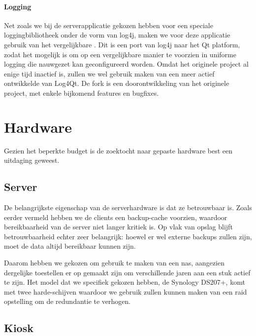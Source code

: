 \subsubsection{Logging}

Net zoals we bij de serverapplicatie gekozen hebben voor een speciale loggingbibliotheek onder de vorm van log4j, maken we voor deze applicatie gebruik van het vergelijkbare . Dit is een port van log4j naar het Qt platform, zodat het mogelijk is om op een vergelijkbare manier te voorzien in uniforme logging die nauwgezet kan geconfigureerd worden. Omdat het originele project al enige tijd inactief is, zullen we wel gebruik maken van een meer actief ontwikkelde  van Log4Qt. De fork is een doorontwikkeling van het originele project, met enkele bijkomend features en bugfixes.


%
%

\chapter{Hardware}
\label{ontwerp:hardware}

Gezien het beperkte budget is de zoektocht naar gepaste hardware best een uitdaging geweest.

\section{Server}
\label{ontwerp:hardware:server}

De belangrijkste eigenschap van de serverhardware is dat ze betrouwbaar is. Zoals eerder vermeld hebben we de clients een backup-cache voorzien, waardoor bereikbaarheid van de server niet langer kritiek is. Op vlak van opslag blijft betrouwbaarheid echter zeer belangrijk: hoewel er wel externe backups zullen zijn, moet de data altijd bereikbaar kunnen zijn.

Daarom hebben we gekozen om gebruik te maken van een \ac{nas}, aangezien dergelijke toestellen er op gemaakt zijn om verschillende jaren aan een stuk actief te zijn. Het model dat we specifiek gekozen hebben, de Synology DS207+, komt met twee harde-schijven waardoor we gebruik zullen kunnen maken van een \ac{raid} opstelling om de redundantie te verhogen.

\section{Kiosk}
\label{ontwerp:hardware:kiosk}

